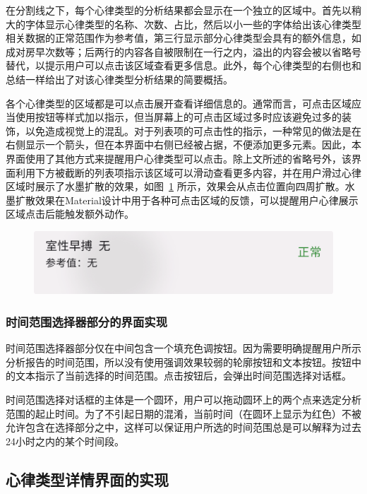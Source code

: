 在分割线之下，每个心律类型的分析结果都会显示在一个独立的区域中。首先以稍大的字体显示心律类型的名称、次数、占比，然后以小一些的字体给出该心律类型相关数据的正常范围作为参考值，第三行显示部分心律类型会具有的额外信息，如成对房早次数等；后两行的内容各自被限制在一行之内，溢出的内容会被以省略号替代，以提示用户可以点击该区域查看更多信息。此外，每个心律类型的右侧也和总结一样给出了对该心律类型分析结果的简要概括。

各个心律类型的区域都是可以点击展开查看详细信息的。通常而言，可点击区域应当使用按钮等样式加以指示，但当屏幕上的可点击区域过多时应该避免过多的装饰，以免造成视觉上的混乱。对于列表项的可点击性的指示，一种常见的做法是在右侧显示一个箭头，但在本界面中右侧已经被占据，不便添加更多元素。因此，本界面使用了其他方式来提醒用户心律类型可以点击。除上文所述的省略号外，该界面利用下方被截断的列表项指示该区域可以滑动查看更多内容，并在用户滑过心律区域时展示了水墨扩散的效果，如图~\ref{fig:ink} 所示，效果会从点击位置向四周扩散。水墨扩散效果在Material设计中用于各种可点击区域的反馈，可以提醒用户心律展示区域点击后能触发额外动作。

\begin{figure}[!ht]
    \centering
    \includegraphics[width=.5\textwidth]{../assets/ink}
    \label{fig:ink}
\end{figure}

\subsubsection{时间范围选择器部分的界面实现}\label{subsubsec:analytics-time-range-ui}

时间范围选择器部分仅在中间包含一个填充色调按钮。因为需要明确提醒用户所示分析报告的时间范围，所以没有使用强调效果较弱的轮廓按钮和文本按钮。按钮中的文本指示了当前选择的时间范围。点击按钮后，会弹出时间范围选择对话框。

时间范围选择对话框的主体是一个圆环，用户可以拖动圆环上的两个点来选定分析范围的起止时间。为了不引起日期的混淆，当前时间（在圆环上显示为红色）不被允许包含在选择部分之中，这样可以保证用户所选的时间范围总是可以解释为过去24小时之内的某个时间段。

\subsection{心律类型详情界面的实现}\label{subsec:label-details}

